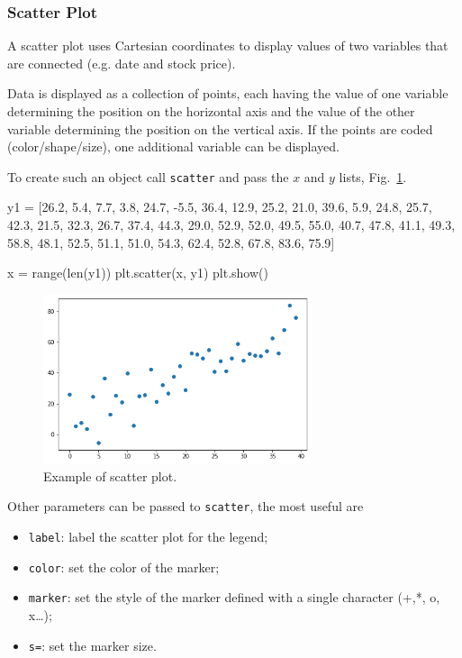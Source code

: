 \subsubsection{Scatter Plot}
\label{scatter}

A scatter plot uses Cartesian coordinates to display values of two variables that are connected (e.g. date and stock price). 

Data is displayed as a collection of points, each having the value of one variable determining the position on the horizontal axis and the value of the other variable determining the position on the vertical axis. If the points are coded (color/shape/size), one additional variable can be displayed.

To create such an object call \texttt{scatter} and pass the $x$ and $y$ lists, Fig.~\ref{fig:scatter1}.

\begin{ipythonnon}
y1 = [26.2, 5.4, 7.7, 3.8, 24.7, -5.5, 36.4, 12.9, 25.2, 21.0, 39.6,
      5.9, 24.8, 25.7, 42.3, 21.5, 32.3, 26.7, 37.4, 44.3, 29.0,
      52.9, 52.0, 49.5, 55.0, 40.7, 47.8, 41.1, 49.3, 58.8, 48.1,
      52.5, 51.1, 51.0, 54.3, 62.4, 52.8, 67.8, 83.6, 75.9]

x = range(len(y1))
plt.scatter(x, y1)
plt.show()
\end{ipythonnon}

\begin{figure}[htb]
	\centering
	\includegraphics[width=0.7\textwidth]{figures/scatter}
	\caption{Example of scatter plot.}
	\label{fig:scatter1}
\end{figure}

Other parameters can be passed to \texttt{scatter}, the most useful are

\begin{itemize}
\tightlist
\item \texttt{label}: label the scatter plot for the legend;
\item \texttt{color}: set the color of the marker;
\item \texttt{marker}: set the style of the marker defined with a single character (+,*, o, x\ldots{});
\item \texttt{s=}: set the marker size.
\end{itemize}

